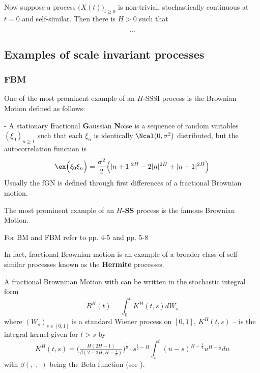 Now suppose a process $\bigl(X(t)\bigr)_{t\geq0}$ is non-trivial, stochastically
continuous at $t=0$ and self-similar. Then there is $H>0$ such that 

\[ \ldots \]


\subsection{Examples of scale invariant processes} %
\label{sub:examples_of_scale_invariant_processes}



\subsubsection{FBM} %
\label{ssub:fbm}

One of the most prominent example of an $H$-SSSI process is the Brownian Motion
defined as follows:

-
A stationary \textbf{f}ractional \textbf{G}aussian \textbf{N}oise is a sequence
of random variables $(\xi_0)_{n\geq1}$ such that each $\xi_n$ is identically $\Ncal(0,\sigma^2)$
distributed, but the autocorrelation function is
\[
\ex\Bigl( \xi_0 \xi_n\Bigr) = \frac{\sigma^2}{2} \Bigl( |n+1|^{2H} - 2|n|^{2H} + |n-1|^{2H} \Bigr)
\]
Usually the fGN is defined through first differences of a fractional Brownian motion.

The most prominent example of an $H$\textbf{-SS} process is the famous Brownian Motion.



For BM and FBM refer to \cite{embrechtsselfsimilar} pp. 4-5 and \cite{embrechts2000introduction} pp. 5-8

In fact, fractional Brownian motion is an example of a broader class of self-similar processes known as
the \textbf{Hermite} processes.

A fractional Browninan Motion with can be written in the stochastic integral form
\[ B^H(t) = \int_0^t K^H(t,s) dW_s \]
where $(W_s)_{s\in[0,1]}$ is a standard Wiener process on $[0,1]$, $K^H(t,s)$
-- is the integral kernel given for $t>s$ by
\[
K^H(t,s)
= \bigl( \tfrac{ H(2H-1) }{\beta(2-2H, H-\tfrac{1}{2})} \bigr)^{\tfrac{1}{2}}
\cdot s^{\frac{1}{2}-H} \int_s^t (u-s)^{H-\frac{1}{2}}u^{H-\frac{1}{2}}du \]
with $\beta(,\cdot, \cdot)$ being the Beta function (see \cite{Chronopoulou:1114288}).

